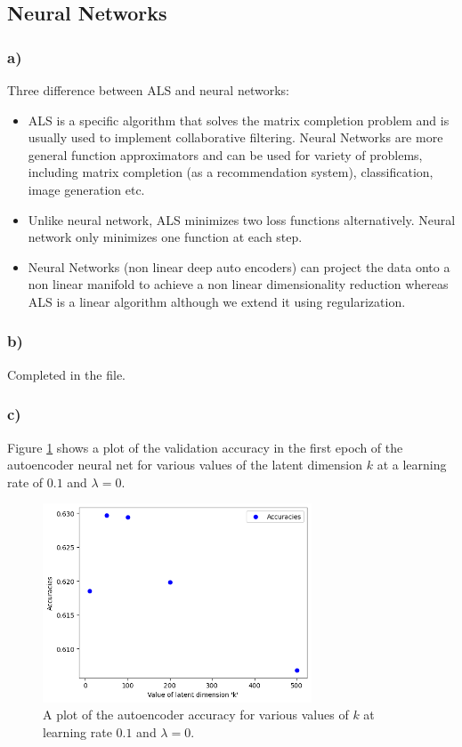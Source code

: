 \documentclass{article}
\begin{document}
\newpage
\subsection*{Neural Networks}
\subsubsection*{a)}
Three difference between ALS and neural networks:
\begin{itemize}
  \item ALS is a specific algorithm that solves the matrix completion problem and is usually used to implement collaborative filtering. Neural Networks are more general function approximators and can be used for variety of problems, including matrix completion (as a recommendation system), classification, image generation etc.  
  \item Unlike neural network, ALS minimizes two loss functions alternatively. Neural network only minimizes one function at each step. 
  \item Neural Networks (non linear deep auto encoders) can project the data onto a non linear manifold to achieve a non linear dimensionality reduction whereas ALS is a linear algorithm although we extend it using regularization. 
\end{itemize}
\subsubsection*{b)}
Completed in the  file.

\subsubsection*{c)}
Figure \ref{fig:different k} shows a plot of the validation accuracy in the first epoch of the autoencoder neural net for various values of the latent dimension $k$ at a learning rate of $0.1$ and $\lambda=0$.

\begin{figure}[H]
    \centering
    \includegraphics[width=8cm]{neural net original accuracy.png}
    \caption{A plot of the autoencoder accuracy for various values of $k$ at learning rate $0.1$ and $\lambda=0$.}
    \label{fig:different k}
\end{figure}
\end{document}
